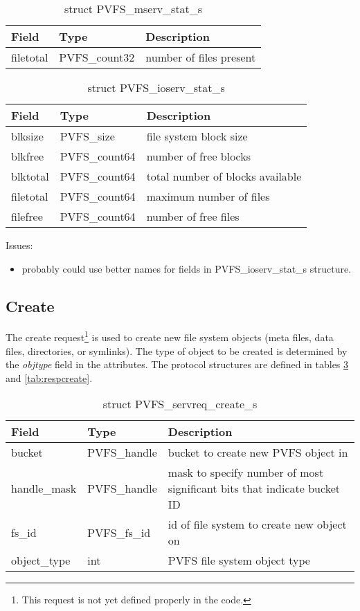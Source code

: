 \documentclass[11pt, letterpaper]{article} %
\begin{document}
\begin{table}[H]
\begin{tabular}{|l|l|l|}
\hline
Field & Type & Description \\
\hline
filetotal & PVFS\_count32 & number of files present\\
\hline
\end{tabular}
\caption{struct PVFS\_mserv\_stat\_s \label{tab:mservstat}}
\end{table}


\begin{table}[H]
\begin{tabular}{|l|l|l|}
\hline
Field & Type & Description \\
\hline
\hline
blksize & PVFS\_size & file system block size\\
\hline
blkfree & PVFS\_count64 & number of free blocks\\
\hline
blktotal & PVFS\_count64 & total number of blocks available\\
\hline
filetotal & PVFS\_count64 & maximum number of files\\
\hline
filefree & PVFS\_count64 & number of free files\\
\hline
\end{tabular}
\caption{struct PVFS\_ioserv\_stat\_s \label{tab:ioservstat}}
\end{table}

Issues:
\begin{itemize}
\item probably could use better names for fields in
PVFS\_ioserv\_stat\_s structure.
\end{itemize}

\subsection{Create}

The create request\footnote{This request is not yet defined properly in
the code.}
is used to create new file system objects (meta
files, data files, directories, or symlinks).  The type of object to be
created is determined by the \emph{objtype} field in the attributes.
The protocol structures
are defined in tables \ref{tab:reqcreate} and \ref{tab:respcreate}.

\begin{table}[H]
\begin{tabular}{|l|l|l|}
\hline
Field & Type & Description \\
\hline
\hline
bucket & PVFS\_handle & bucket to create new PVFS object in\\
\hline
handle\_mask & PVFS\_handle & mask to specify number of most significant
bits that indicate bucket ID\\
\hline
fs\_id & PVFS\_fs\_id & id of file system to create new object on\\
\hline
object\_type & int & PVFS file system object type\\
\hline
\end{tabular}
\caption{struct PVFS\_servreq\_create\_s \label{tab:reqcreate}}
\end{table}
\end{document}
